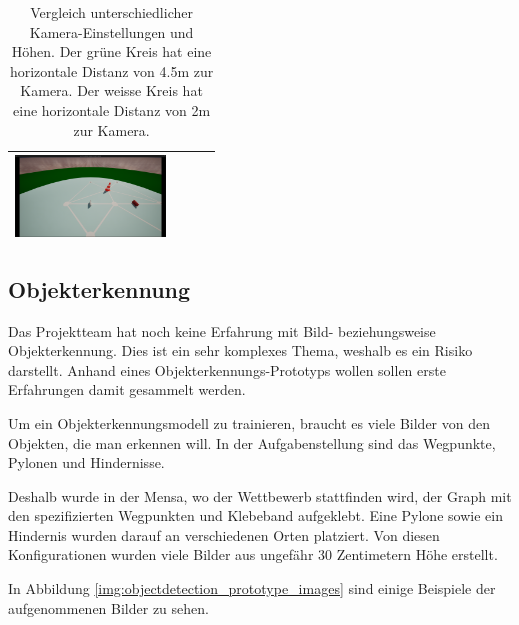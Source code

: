 \documentclass[../main.tex]{subfiles}
\begin{document}
\begin{table}[H]
\begin{tabular}{|c|c|c|c|}
        \includegraphics[width=4cm]{img/unrealengine/h75_f120_w45.png} \\
        \hline
    \end{tabular}
    \caption{Vergleich unterschiedlicher Kamera-Einstellungen und Höhen. Der grüne Kreis hat eine horizontale Distanz von 4.5m zur Kamera. Der weisse Kreis hat eine horizontale Distanz von 2m zur Kamera.}
\end{table}

\subsection{Objekterkennung}

Das Projektteam hat noch keine Erfahrung mit Bild- beziehungsweise Objekterkennung.  
Dies ist ein sehr komplexes Thema, weshalb es ein Risiko darstellt.  
Anhand eines Objekterkennungs-Prototyps wollen sollen erste Erfahrungen damit gesammelt werden.

Um ein Objekterkennungsmodell zu trainieren, braucht es viele Bilder von den Objekten, die man erkennen will. In der Aufgabenstellung sind das Wegpunkte, Pylonen und Hindernisse.

Deshalb wurde in der Mensa, wo der Wettbewerb stattfinden wird, der Graph mit den spezifizierten Wegpunkten und Klebeband aufgeklebt. Eine Pylone sowie ein Hindernis wurden darauf an verschiedenen Orten platziert. Von diesen Konfigurationen wurden viele Bilder aus ungefähr 30 Zentimetern Höhe erstellt.

In Abbildung \ref{img:objectdetection_prototype_images} sind einige Beispiele der aufgenommenen Bilder zu sehen.
\end{document}
